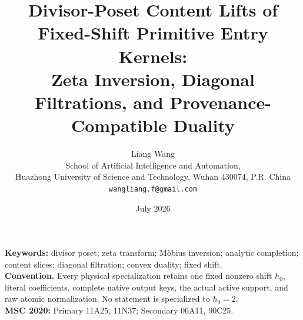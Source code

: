 \documentclass[11pt]{article}
\title{Divisor-Poset Content Lifts of Fixed-Shift Primitive Entry Kernels:\\
Zeta Inversion, Diagonal Filtrations, and Provenance-Compatible Duality}
\author{Liang Wang\\
School of Artificial Intelligence and Automation,\\
Huazhong University of Science and Technology, Wuhan 430074, P.R. China\\
\texttt{wangliang.f@gmail.com}}
\date{July 2026}
\theoremstyle{remark}
\begin{document}
\maketitle


\noindent\textbf{Keywords:} divisor poset; zeta transform; M\"obius
inversion; analytic completion; content slices; diagonal filtration;
convex duality; fixed shift.\\[0.5em]
\noindent\textbf{Convention.} Every physical specialization retains one
fixed nonzero shift \(h_0\), literal coefficients, complete native output
keys, the actual active support, and raw atomic normalization.  No
statement is specialized to \(h_0=2\).\\[0.5em]
\noindent\textbf{MSC 2020:} Primary 11A25, 11N37; Secondary 06A11, 90C25.










\begingroup
\small
\raggedright


\endgroup
\end{document}
